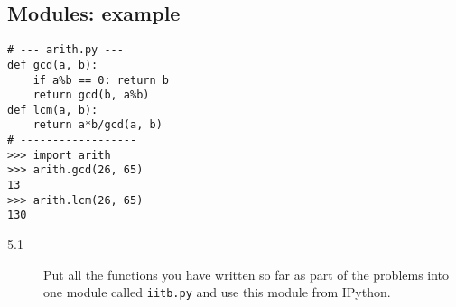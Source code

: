 \documentclass[12pt]{article}
\begin{document}
  \subsection{Modules: example}
  \begin{verbatim}
# --- arith.py ---
def gcd(a, b):
    if a%b == 0: return b
    return gcd(b, a%b)
def lcm(a, b):
    return a*b/gcd(a, b)
# ------------------
>>> import arith
>>> arith.gcd(26, 65)
13
>>> arith.lcm(26, 65)
130
  \end{verbatim}

  \begin{description}
    \item[5.1] Put all the functions you have written so far as part of the problems
  into one module called \texttt{iitb.py} and use this module from IPython.
\end{description}
\end{document}
